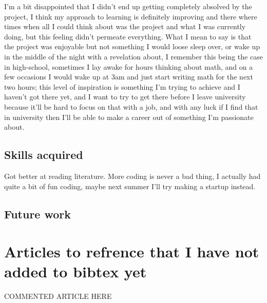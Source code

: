 \documentclass[12pt]{article}
\begin{document}
I'm a bit disappointed that I didn't end up getting completely absolved by the project, I think my approach to learning is definitely improving and there where times when all I could think about was the project and what I was currently doing, but this feeling didn't permeate everything. What I mean to say is that the project was enjoyable but not something I would loose sleep over, or wake up in the middle of the night with a revelation about, I remember this being the case in high-school, sometimes I lay awake for hours thinking about math, and on a few occasions I would wake up at 3am and just start writing math for the next two hours; this level of inspiration is something I'm trying to achieve and I haven't got there yet, and I want to try to get there before I leave university because it'll be hard to focus on that with a job, and with any luck if I find that in university then I'll be able to make a career out of something I'm passionate about. 

\subsection{Skills acquired}
Got better at reading literature. More coding is never a bad thing, I actually had quite a bit of fun coding, maybe next summer I'll try making a startup instead.


\subsection{Future work}




\section{Articles to refrence that I have not added to bibtex yet}
COMMENTED ARTICLE HERE




\end{document}
